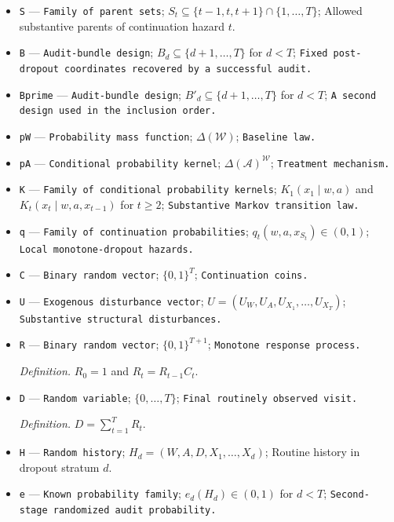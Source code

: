 \documentclass{article}
\begin{document}
\begin{itemize}
  \item \texttt{S} --- \texttt{Family of parent sets}; \(S_t\subseteq\{t-1,t,t+1\}\cap\{1,\ldots,T\}\); Allowed substantive parents of continuation hazard \(t\).
  \item \texttt{B} --- \texttt{Audit-\allowbreak{}bundle design}; \(B_d\subseteq\{d+1,\ldots,T\}\) for \(d<T\); \texttt{Fixed post-\allowbreak{}dropout coordinates recovered by a successful audit.}
  \item \texttt{Bprime} --- \texttt{Audit-\allowbreak{}bundle design}; \(B'_d\subseteq\{d+1,\ldots,T\}\) for \(d<T\); \texttt{A second design used in the inclusion order.}
  \item \texttt{pW} --- \texttt{Probability mass function}; \(\Delta(\mathcal W)\); \texttt{Baseline law.}
  \item \texttt{pA} --- \texttt{Conditional probability kernel}; \(\Delta(\mathcal A)^{\mathcal W}\); \texttt{Treatment mechanism.}
  \item \texttt{K} --- \texttt{Family of conditional probability kernels}; \(K_1(x_1\mid w,a)\) and \(K_t(x_t\mid w,a,x_{t-1})\) for \(t\ge2\); \texttt{Substantive Markov transition law.}
  \item \texttt{q} --- \texttt{Family of continuation probabilities}; \(q_t(w,a,x_{S_t})\in(0,1)\); \texttt{Local monotone-\allowbreak{}dropout hazards.}
  \item \texttt{C} --- \texttt{Binary random vector}; \(\{0,1\}^T\); \texttt{Continuation coins.}
  \item \texttt{U} --- \texttt{Exogenous disturbance vector}; \(U=(U_W,U_A,U_{X_1},\ldots,U_{X_T})\); \texttt{Substantive structural disturbances.}
  \item \texttt{R} --- \texttt{Binary random vector}; \(\{0,1\}^{T+1}\); \texttt{Monotone response process.}
  \par\smallskip\noindent\emph{Definition.} \(R_0=1\) and \(R_t=R_{t-1}C_t\).
  \item \texttt{D} --- \texttt{Random variable}; \(\{0,\ldots,T\}\); \texttt{Final routinely observed visit.}
  \par\smallskip\noindent\emph{Definition.} \(D=\sum_{t=1}^T R_t\).
  \item \texttt{H} --- \texttt{Random history}; \(H_d=(W,A,D,X_1,\ldots,X_d)\); Routine history in dropout stratum \(d\).
  \item \texttt{e} --- \texttt{Known probability family}; \(e_d(H_d)\in(0,1)\) for \(d<T\); \texttt{Second-\allowbreak{}stage randomized audit probability.}

\end{itemize}
\end{document}
